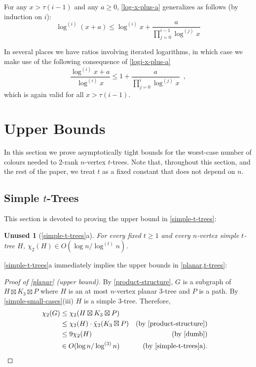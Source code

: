 \documentclass[kpfonts]{patmorin}
\newcommand{\trn}{\chi_2}
\newcommand{\dtcn}{\bar{\chi}_2}
\theoremstyle{named}
\newtheorem*{namedtheorem}{Unused}
\newcommand{\weirdref}[2]{\cref{#1}#2}
\newcommand{\weirdlabel}[2]{\label{#1-#1}}
\begin{document}
For any $x > \tau(i-1)$ and any $a\ge 0$, \cref{log-x-plus-a} generalizes as follows (by induction on $i$):
\begin{equation}
    \log^{(i)}(x+a) \le \log^{(i)} x + \frac{a}{\prod_{j=0}^{i-1}\log^{(j)} x} \label{logi-x-plus-a}
\end{equation}

In several places we have ratios involving iterated logarithms, in which case we make use of the following consequence of \cref{logi-x-plus-a}
\begin{equation}
    \frac{\log^{(i)} x+a}{\log^{(i)} x} \le 1 + \frac{a}{\prod_{j=0}^{i}\log^{(j)} x} \enspace, \label{logi-ratio}
\end{equation}
which is again valid for all $x> \tau(i-1)$.

\section{Upper Bounds}
\label{upper-bounds}

In this section we prove asymptotically tight bounds for the worst-case number of colours needed to 2-rank $n$-vertex $t$-trees.  Note that, throughout this section, and the rest of the paper, we treat $t$ as a fixed constant that does not depend on $n$.

\subsection{Simple $t$-Trees}

This section is devoted to proving the upper bound in \cref{simple-t-trees}:

\begin{namedtheorem}[\weirdref{simple-t-trees}{a}]\weirdlabel{simple-t-trees}{a}
    For every fixed $t\ge 1$ and every $n$-vertex simple $t$-tree $H$, $\trn(H)\in O(\log n/\log^{(t)} n)$.
\end{namedtheorem}

\weirdref{simple-t-trees}{a} immediately implies the upper bounds in \cref{planar,t-trees}:

\begin{proof}[Proof of \cref{planar} (upper bound)]
    By \cref{product-structure}, $G$ is a subgraph of $H\boxtimes K_3\boxtimes P$ where $H$ is an at most $n$-vertex planar 3-tree and $P$ is a path. By \cref{simple-small-cases}(iii) $H$ is a simple 3-tree. Therefore,
    \begin{align*}
        \trn(G) & \le \trn(H\boxtimes K_3\boxtimes P) \\
                & \le \trn(H)\cdot \dtcn(K_3\boxtimes P)
                    & \text{(by \cref{product-structure})}\\
                & \le 9\trn(H) & \text{(by \cref{dumb})} \\
                & \in O(\log n/\log^{(3)} n) & \text{(by \weirdref{simple-t-trees}{a}).} & \qedhere
    \end{align*}
\end{proof}
\end{document}
